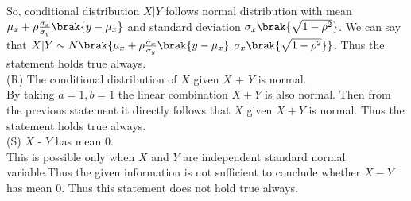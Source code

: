 \documentclass[journal,12pt,twocolumn]{IEEEtran}
\begin{document}
So, conditional distribution $X|Y$ follows normal distribution with mean $\mu_x+\rho\frac{\sigma_x}{\sigma_y}\brak{y-\mu_x}$ and standard deviation $\sigma_x\brak{\sqrt{1-\rho^2}}$. We can say that $X|Y \sim N\brak{\mu_x+\rho\frac{\sigma_x}{\sigma_y}\brak{y-\mu_x},\sigma_x\brak{\sqrt{1-\rho^2}}}$. Thus the statement holds true always.
\\
(R) The conditional distribution of $X$ given $X$ + $Y$ is normal.\\
By taking $a=1, b=1$ the linear combination $X+Y$ is also normal. Then from the previous statement it directly follows that $X$ given $X+Y$ is normal.
Thus the statement holds true always.
\\
(S) $X$ - $Y$ has mean $0$.\\
This is possible only when $X$ and $Y$ are independent standard normal variable.Thus the given information is not sufficient to conclude whether $X-Y$ has mean $0$. Thus this statement does not hold true always. 
\end{document}
